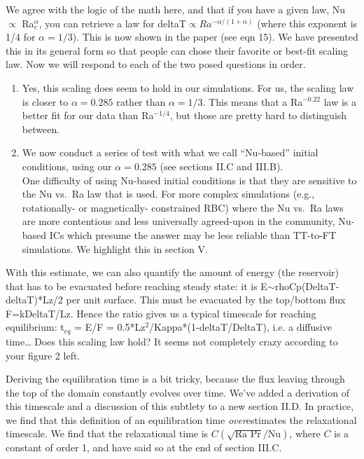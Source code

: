 \documentclass[aps, 11pt, singlecolumn]{revtex4-1} %
\begin{document}
\begin{singlespace}
\begin{myquotation}
\begin{itemize}
\begin{itemize}
\end{itemize}
\end{itemize}
\end{myquotation}
We agree with the logic of the math here, and that if you have a given law, Nu $\propto$ Ra$_e^{\alpha}$, you can retrieve a law for deltaT$\propto Ra^{-\alpha/(1+\alpha)}$ (where this exponent is 1/4 for $\alpha = 1/3$).
This is now shown in the paper (see eqn 15).
We have presented this in its general form so that people can chose their favorite or best-fit scaling law.
Now we will respond to each of the two posed questions in order.
\begin{enumerate}
\item 
Yes, this scaling does seem to hold in our simulations.
For us, the scaling law is closer to $\alpha = 0.285$ rather than $\alpha = 1/3$.
This means that a Ra$^{-0.22}$ law is a better fit for our data than Ra$^{-1/4}$, but those are pretty hard to distinguish between.
\item 
We now conduct a series of test with what we call ``Nu-based'' initial conditions, using our $\alpha = 0.285$ (see sections II.C and III.B).
\vspace{0.5cm}
\\
One difficulty of using Nu-based initial conditions is that they are sensitive to the Nu vs.~Ra law that is used.
For more complex simulations (e.g., rotationally- or magnetically- constrained RBC) where the Nu vs.~Ra laws are more contentious and less universally agreed-upon in the community, Nu-based ICs which presume the answer may be less reliable than TT-to-FT simulations.
We highlight this in section V.
\end{enumerate}


\begin{myquotation}
With this estimate, we can also quantify the amount of energy (the reservoir) that has to be evacuated before reaching steady state: it is E$\sim$rhoCp(DeltaT-deltaT)*Lz/2 per unit surface. 
This must be evacuated by the top/bottom flux F=kDeltaT/Lz. 
Hence the ratio gives us a typical timescale for reaching equilibrium: t$_{eq}$ = E/F = 0.5*Lz$^2$/Kappa*(1-deltaT/DeltaT), i.e. a diffusive time…
Does this scaling law hold? It seems not completely crazy according to your figure 2 left.
\end{myquotation}
Deriving the equilibration time is a bit tricky, because the flux leaving through the top of the domain constantly evolves over time.
We've added a derivation of this timescale and a discussion of this subtlety to a new section II.D.
In practice, we find that this definition of an equilibration time \emph{over}estimates the relaxational timescale.
We find that the relaxational time is $C (\sqrt{\text{Ra Pr}}/\text{Nu})$, where $C$ is a constant of order 1, and have said so at the end of section III.C.


\end{singlespace}
\end{document}
